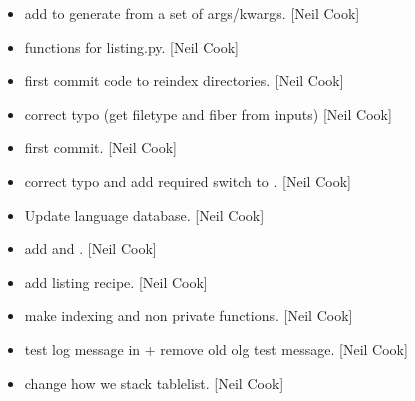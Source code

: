\documentclass[a4paper,10pt,english]{report}
\begin{document}
\label{\detokenize{misc/changelog:id90}}\begin{itemize}
\item {} 
 \sphinxhyphen{} add  to
generate  from a set of args/kwargs. {[}Neil Cook{]}

\item {} 
 \sphinxhyphen{} functions for listing.py. {[}Neil
Cook{]}

\item {} 
 \sphinxhyphen{} first commit \sphinxhyphen{} code to re\sphinxhyphen{}index directories.
{[}Neil Cook{]}

\item {} 
 \sphinxhyphen{} correct typo (get filetype
and fiber from inputs) {[}Neil Cook{]}

\item {} 
 \sphinxhyphen{} first commit. {[}Neil Cook{]}

\item {} 
 \sphinxhyphen{} correct typo and add required switch to
. {[}Neil Cook{]}

\item {} 
Update language database. {[}Neil Cook{]}

\item {} 
 \sphinxhyphen{} add  and
. {[}Neil Cook{]}

\item {} 
 \sphinxhyphen{} add listing recipe.
{[}Neil Cook{]}

\item {} 
 \sphinxhyphen{} make indexing and  non
private functions. {[}Neil Cook{]}

\item {} 
 \sphinxhyphen{} test log message in  + remove
old olg test message. {[}Neil Cook{]}

\item {} 
 \sphinxhyphen{} change how we stack tablelist. {[}Neil Cook{]}


\end{itemize}
\end{document}
